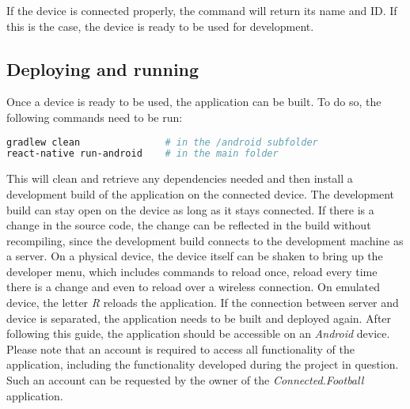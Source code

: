 If the device is connected properly, the command will return its name and ID. If this is the case, the device is ready to be used for development.

\subsection{Deploying and running}
\label{ssec:deploy}

Once a device is ready to be used, the application can be built. To do so, the following commands need to be run:

\begin{lstlisting}[language=bash,caption=Building and Deploying,label=buildAndDeploy]
gradlew clean               # in the /android subfolder
react-native run-android    # in the main folder
\end{lstlisting}

This will clean and retrieve any dependencies needed and then install a development build of the application on the connected device. The development build can stay open on the device as long as it stays connected. If there is a change in the source code, the change can be reflected in the build without recompiling, since the development build connects to the development machine as a server. On a physical device, the device itself can be shaken to bring up the developer menu, which includes commands to reload once, reload every time there is a change and even to reload over a wireless connection. On emulated device, the letter \textit{R} reloads the application. If the connection between server and device is separated, the application needs to be built and deployed again.
\newline
After following this guide, the application should be accessible on an \textit{Android} device. Please note that an account is required to access all functionality of the application, including the functionality developed during the project in question. Such an account can be requested by the owner of the \textit{Connected.Football} application.
